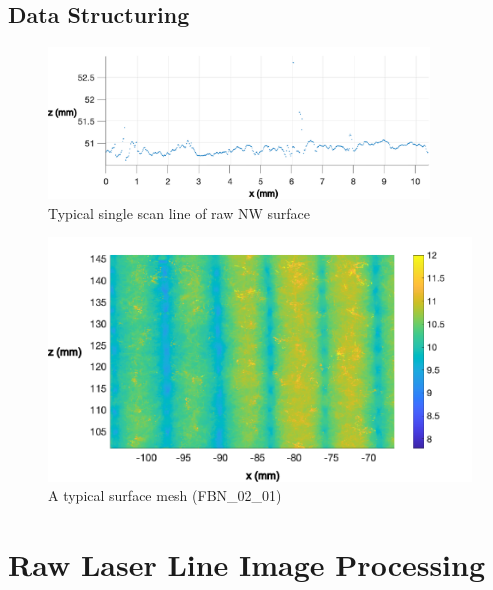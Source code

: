 \documentclass[12pt]{report}
\begin{document}
\subsection{Data Structuring}

\begin{figure}
    \centering
    \includegraphics[width=0.9\textwidth]{figures/profile_measure/typical_nw_cross.pdf}
    \caption{Typical single scan line of raw NW surface}
    \label{fig:raw_nw_cross}
\end{figure}

\begin{figure}
    \centering
    \includegraphics{figures/profile_measure/typical_rear_mesh.pdf}
    \caption{A typical surface mesh (FBN\_02\_01)}
    \label{fig:my_label}
\end{figure}

\pagebreak
\section{Raw Laser Line Image Processing}
\end{document}
